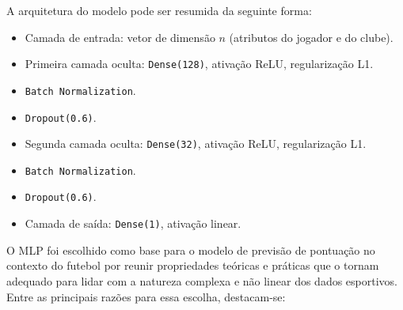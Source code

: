 A arquitetura do modelo pode ser resumida da seguinte forma:

\begin{itemize}
    \item Camada de entrada: vetor de dimensão $n$ (atributos do jogador e do clube).
    \item Primeira camada oculta: \texttt{Dense(128)}, ativação ReLU, regularização L1.
    \item \texttt{Batch Normalization}.
    \item \texttt{Dropout(0.6)}.
    \item Segunda camada oculta: \texttt{Dense(32)}, ativação ReLU, regularização L1.
    \item \texttt{Batch Normalization}.
    \item \texttt{Dropout(0.6)}.
    \item Camada de saída: \texttt{Dense(1)}, ativação linear.
\end{itemize}


O MLP foi escolhido como base para o modelo de previsão de pontuação no contexto do futebol por reunir propriedades teóricas e práticas que o tornam adequado para lidar com a natureza complexa e não linear dos dados esportivos. Entre as principais razões para essa escolha, destacam-se:

